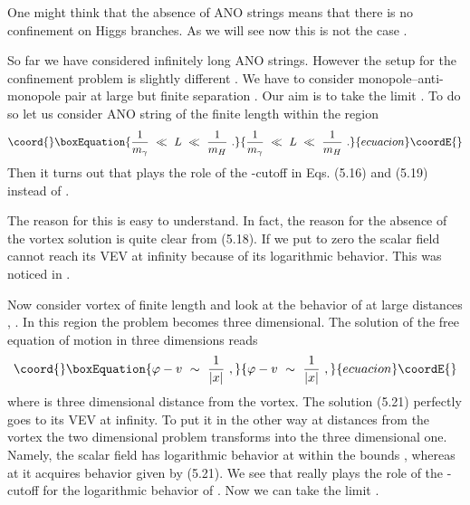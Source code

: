 \documentclass[a4paper,12pt]{article}
\begin{document}
One might think that the 
 absence of ANO strings means that there is no
  confinement on Higgs branches. As
we will see now this is not  the case \cite{Y}.

So far we have considered infinitely long ANO strings. However
the setup for the confinement problem is slightly different
\cite{Y}. We have to consider monopole--anti-monopole pair at
large but finite separation \coordHE{}. Our aim is to take the limit
\coordHE{}. To do so let us consider ANO string of the finite
length \coordHE{} within the region
\begin{equation}\coord{}\boxEquation{
\frac1{m_\gamma}\ \ll\ L\ \ll\ \frac1{m_H}\ .
}{
\frac1{m_\gamma}\ \ll\ L\ \ll\ \frac1{m_H}\ .
}{ecuacion}\coordE{}\end{equation}
Then it turns out that \coordHE{} plays the role of the \coordHE{}-cutoff
 in Eqs. (5.16) and (5.19) instead of \coordHE{} \cite{Y}.

The reason for this is easy to understand. In fact, the reason
for the absence of the vortex solution is quite clear from
(5.18). If we put \coordHE{} to zero the scalar field \myHighlight{$\varphi$}\coordHE{}
cannot reach its VEV at infinity because of its logarithmic
behavior. This was noticed in \cite{R}.

Now consider vortex of finite length \coordHE{} and look at the
behavior of \myHighlight{$\varphi$}\coordHE{} at large distances \coordHE{}, \coordHE{}.
In this region the problem becomes three dimensional. The
solution of the free equation of motion in three dimensions
reads
\begin{equation}\coord{}\boxEquation{
\varphi-v\ \sim\ \frac1{|x|}\ ,
}{
\varphi-v\ \sim\ \frac1{|x|}\ ,
}{ecuacion}\coordE{}\end{equation}
where \coordHE{} is three dimensional distance from the vortex. The
solution (5.21) perfectly goes to its VEV \coordHE{} at infinity. To
put it in the other way at distances \coordHE{} from the vortex
the two dimensional problem transforms into the three dimensional one.
Namely, the scalar field has logarithmic behavior at \coordHE{} within the 
bounds  \coordHE{}, whereas at \coordHE{} it acquires \coordHE{}
behavior given by (5.21).
We see that \coordHE{} really plays the role of the \coordHE{}-cutoff for the
logarithmic behavior of \myHighlight{$\varphi$}\coordHE{}. Now we can take the limit \coordHE{}.
\end{document}
